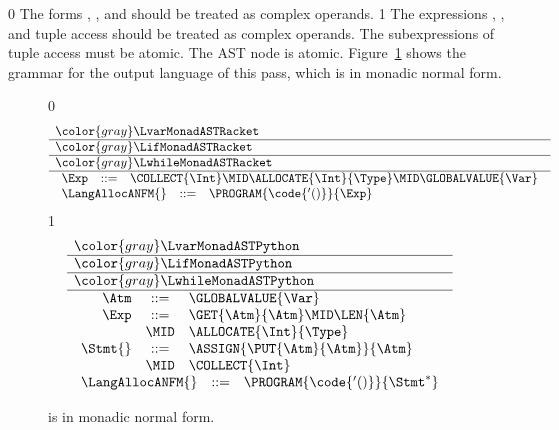 \documentclass[7x10]{TimesAPriori_MIT}%
\newcommand{\gray}[1]{{\color{gray} #1}}
\def\racketEd{0}
\def\pythonEd{1}
\providecommand{\BookEdition}{1}
\let\edition\BookEdition
\newcommand{\pythonColor}[0]{}
\numberwithin{theorem}{chapter}
\numberwithin{definition}{chapter}
\numberwithin{equation}{chapter}
\begin{document}
{\if\edition\racketEd
%
The forms , , and 
should be treated as complex operands.
%
\fi}
%
{\if\edition\pythonEd\pythonColor
%
The expressions , ,
and tuple access should be treated as complex operands.  The
subexpressions of tuple access must be atomic.
The  AST node is atomic.
%
\fi}
Figure~\ref{fig:Lvec-anf-syntax}
shows the grammar for the output language \LangAllocANF{} of this
pass, which is \LangAlloc{} in monadic normal form.

\newcommand{\LtupMonadASTRacket}{
\begin{array}{rcl}
\Exp &::=& \COLLECT{\Int} \MID \ALLOCATE{\Int}{\Type}
   \MID \GLOBALVALUE{\Var}
\end{array}
}

\newcommand{\LtupMonadASTPython}{
\begin{array}{rcl}
\Atm &::=& \GLOBALVALUE{\Var} \\
\Exp &::=& \GET{\Atm}{\Atm} 
     \MID \LEN{\Atm}\\
   &\MID& \ALLOCATE{\Int}{\Type}\\
\Stmt{} &::=& \ASSIGN{\PUT{\Atm}{\Atm}}{\Atm} \\
   &\MID& \COLLECT{\Int}
\end{array}
}

\begin{figure}[tp]
\centering
\begin{tcolorbox}[colback=white]
\small
{\if\edition\racketEd    
\[
\begin{array}{l}
  \gray{\LvarMonadASTRacket} \\ \hline
  \gray{\LifMonadASTRacket} \\ \hline
  \gray{\LwhileMonadASTRacket} \\ \hline
    \LtupMonadASTRacket \\
\begin{array}{rcl}
\LangAllocANFM{}  &::=& \PROGRAM{\code{'()}}{\Exp} 
\end{array}
\end{array}
\]
\fi}
{\if\edition\pythonEd\pythonColor
\[
\begin{array}{l}
  \gray{\LvarMonadASTPython} \\ \hline
  \gray{\LifMonadASTPython} \\ \hline
  \gray{\LwhileMonadASTPython} \\ \hline
  \LtupMonadASTPython   \\
  \begin{array}{rcl}
     \LangAllocANFM{} &::=& \PROGRAM{\code{'()}}{\Stmt^{*}}
  \end{array}
\end{array}
\]
\fi}
\end{tcolorbox}

\caption{\LangAllocANF{} is \LangAlloc{} in monadic normal form.}
\label{fig:Lvec-anf-syntax}
\end{figure}
\end{document}
